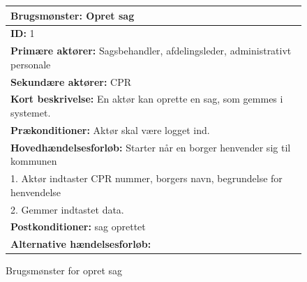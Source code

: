 \begin{figure} [htb!]
\begin{longtable}{|p{18cm}|}
\hline
\textbf{Brugsmønster: }Opret sag \\
\hline
\textbf{ID: }1 \\
\hline
\textbf{Primære aktører: }Sagsbehandler, afdelingsleder, administrativt personale\\
\hline
\textbf{Sekundære aktører: }CPR\\
\hline
\textbf{Kort beskrivelse: }En aktør kan oprette en sag, som gemmes i systemet. \\
\hline
\textbf{Prækonditioner: }Aktør skal være logget ind.\\
\hline
\textbf{Hovedhændelsesforløb: }\newline 
Starter når en borger henvender sig til kommunen \\
1. Aktør indtaster CPR nummer, borgers navn, begrundelse for henvendelse \\
2. Gemmer indtastet data.	
\\
\hline
\textbf{Postkonditioner: }sag oprettet\\
\hline
\textbf{Alternative hændelsesforløb: }\\
\hline
\end{longtable}
\caption{Brugsmønster for opret sag}
\label{tab:1}
\end{figure}

